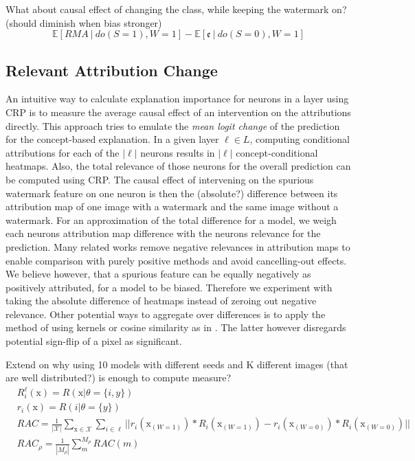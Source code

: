 {\color{gray}
What about causal effect of changing the class, while keeping the watermark on? (should diminish when bias stronger)
\begin{equation}\displaystyle
    \mathbb{E} [RMA \ | \ do(S=1), W = 1  ] - \mathbb{E} [ \mathfrak{e} \ | \ do(S=0), W = 1 ]
\end{equation}
}

\subsection{Relevant Attribution Change}
An intuitive way to calculate explanation importance for neurons in a layer using CRP is to measure the average causal effect of an intervention on the attributions directly. This approach tries to emulate the \textit{mean logit change} of the prediction for the concept-based explanation. In a given layer $\ell \in L$, computing conditional attributions for each of the $|\ell|$ neurons results in $|\ell|$ concept-conditional heatmaps. Also, the total relevance of those neurons for the overall prediction can be computed using CRP.
The causal effect of intervening on the spurious watermark feature on one neuron is then the (absolute?) difference between its attribution map of one image with a watermark and the same image without a watermark. For an approximation of the total difference for a model, we weigh each neurons attribution map difference with the neurons relevance for the prediction. 
Many related works remove negative relevances in attribution maps to enable comparison with purely positive methods and avoid cancelling-out effects. We believe however, that a spurious feature can be equally negatively as positively attributed, for a model to be biased. Therefore we experiment with taking the absolute difference of heatmaps instead of zeroing out negative relevance. 
Other potential ways to aggregate over differences is to apply the method of \cite{Karimi2023} using kernels or cosine similarity as in \cite{Dreyer2023a}. The latter however disregards potential sign-flip of a pixel as significant. 

Extend on why using 10 models with different seeds and K different images (that are well distributed?) is enough to compute measure? 
\begin{align*}
& R_i^{\ell}(\mathrm{x}) = R(\mathrm{x} | \theta=\{i, y\}) \\
& r_i(\mathrm{x}) = R(i | \theta=\{y\}) \\
& RAC = \frac{1}{|\mathcal{X}| }\sum_{\mathrm{x} \in \mathcal{X}} \sum_{i \in \ell} || r_i(\mathrm{x}_{(W=1)}) * R_i(\mathrm{x}_{(W=1)}) -  r_i(\mathrm{x}_{(W=0)}) * R_i(\mathrm{x}_{(W=0)})  || \\
& RAC_{\rho} = \frac{1}{|M_\rho|}\sum_{m}^{M_{\rho}} RAC(m)
\end{align*}

